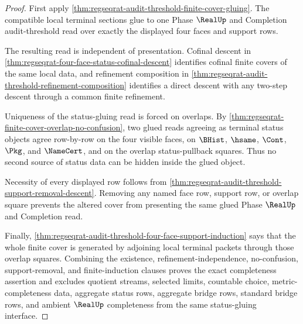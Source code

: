 \begin{proof}
First apply \autoref{thm:regseqrat-audit-threshold-finite-cover-gluing}. The compatible local terminal sections glue to one Phase $\RealUp$ and Completion audit-threshold read over exactly the displayed four faces and support rows.

The resulting read is independent of presentation. Cofinal descent in \autoref{thm:regseqrat-four-face-status-cofinal-descent} identifies cofinal finite covers of the same local data, and refinement composition in \autoref{thm:regseqrat-audit-threshold-refinement-composition} identifies a direct descent with any two-step descent through a common finite refinement.

Uniqueness of the status-gluing read is forced on overlaps. By \autoref{thm:regseqrat-finite-cover-overlap-no-confusion}, two glued reads agreeing as terminal status objects agree row-by-row on the four visible faces, on $\BHist$, $\hsame$, $\Cont$, $\Pkg$, and $\NameCert$, and on the overlap status-pullback squares. Thus no second source of status data can be hidden inside the glued object.

Necessity of every displayed row follows from \autoref{thm:regseqrat-audit-threshold-support-removal-descent}. Removing any named face row, support row, or overlap square prevents the altered cover from presenting the same glued Phase $\RealUp$ and Completion read.

Finally, \autoref{thm:regseqrat-audit-threshold-four-face-support-induction} says that the whole finite cover is generated by adjoining local terminal packets through those overlap squares. Combining the existence, refinement-independence, no-confusion, support-removal, and finite-induction clauses proves the exact completeness assertion and excludes quotient streams, selected limits, countable choice, metric-completeness data, aggregate status rows, aggregate bridge rows, standard bridge rows, and ambient $\RealUp$ completeness from the same status-gluing interface.
\end{proof}

